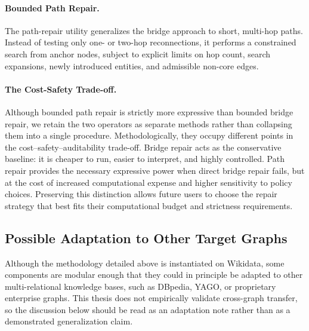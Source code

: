 \documentclass[12pt,a4paper]{article}
\begin{document}
\paragraph{Bounded Path Repair.} 
The path-repair utility generalizes the bridge approach to short, multi-hop paths. Instead of testing only one- or two-hop reconnections, it performs a constrained search from anchor nodes, subject to explicit limits on hop count, search expansions, newly introduced entities, and admissible non-core edges. 

\paragraph{The Cost-Safety Trade-off.}
Although bounded path repair is strictly more expressive than bounded bridge repair, we retain the two operators as separate methods rather than collapsing them into a single procedure. Methodologically, they occupy different points in the cost--safety--auditability trade-off. Bridge repair acts as the conservative baseline: it is cheaper to run, easier to interpret, and highly controlled. Path repair provides the necessary expressive power when direct bridge repair fails, but at the cost of increased computational expense and higher sensitivity to policy choices. Preserving this distinction allows future users to choose the repair strategy that best fits their computational budget and strictness requirements.

\subsection{Possible Adaptation to Other Target Graphs}
\label{sec:generalization}

Although the methodology detailed above is instantiated on Wikidata, some components are modular enough that they could in principle be adapted to other multi-relational knowledge bases, such as DBpedia, YAGO, or proprietary enterprise graphs. This thesis does not empirically validate cross-graph transfer, so the discussion below should be read as an adaptation note rather than as a demonstrated generalization claim.
\end{document}
